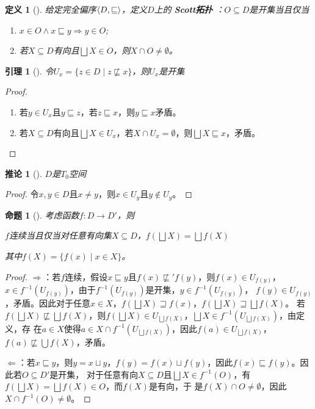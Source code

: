\documentclass[11pt]{article}
\newtheorem{corollary}[theorem]{推论}
\newtheorem{proposition}[theorem]{命题}
\newtheorem{lemma}[theorem]{引理}
\newtheorem{definition}[theorem]{定义}
\begin{document}
\begin{definition}[]
给定完全偏序\(\langle D,\sqsubseteq\rangle\)，定义\(D\)上的 \textbf{Scott拓扑} ：\(O\subseteq D\)是开集当且仅当
\begin{enumerate}
\item \(x\in O\wedge x\sqsubseteq y\Rightarrow y\in O\);
\item 若\(X\subseteq D\)有向且\(\bigsqcup X\in O\)，则\(X\cap O\neq\emptyset\)。
\end{enumerate}
\end{definition}

\begin{lemma}[]
令\(U_x=\{z\in D\mid z\not\sqsubseteq x\}\)，则\(U_x\)是开集
\end{lemma}

\begin{proof}
\begin{enumerate}
\item 若\(y\in U_x\)且\(y\sqsubseteq z\)，若\(z\sqsubseteq x\)，则\(y\sqsubseteq x\)矛盾。
\item 若\(X\subseteq D\)有向且\(\bigsqcup X\in U_x\)，若\(X\cap U_x=\emptyset\)，则\(\bigsqcup X\sqsubseteq x\)，矛盾。
\end{enumerate}
\end{proof}

\begin{corollary}[]
\(D\)是\(T_0\)空间
\end{corollary}

\begin{proof}
令\(x,y\in D\)且\(x\neq y\)，则\(x\in U_y\)且\(y\notin U_y\)。
\end{proof}

\begin{proposition}[]
考虑函数\(f:D\to D'\)，则
\begin{center}
\(f\)连续当且仅当对任意有向集\(X\subseteq D\)，\(f(\bigsqcup X)=\bigsqcup f(X)\)
\end{center}
其中\(f(X)=\{f(x)\mid x\in X\}\)。
\end{proposition}

\begin{proof}
\(\Rightarrow\)：若\(f\)连续，假设\(x\sqsubseteq y\)且\(f(x)\not\sqsubseteq' f(y)\)，则\(f(x)\in U_{f(y)}\)，
\(x\in f^{-1}(U_{f(y)})\)，由于\(f^{-1}(U_{f(y)})\)是开集，\(y\in f^{-1}(U_{f(y)})\)，
\(f(y)\in U_{f(y)}\)，矛盾。因此对于任意\(x\in X\)，\(f(\bigsqcup X)\sqsupseteq f(x)\)，\(f(\bigsqcup X)\sqsupseteq\bigsqcup f(X)\)。
若\(f(\bigsqcup X)\not\sqsubseteq\bigsqcup f(X)\)，则\(f(\bigsqcup X)\in U_{\bigsqcup f(X)}\)，\(\bigsqcup X\in f^{-1}(U_{\bigsqcup f(X)})\)，由定义，存
在\(a\in X\)使得\(a\in X\cap f^{-1}(U_{\bigsqcup f(X)})\)，因此\(f(a)\in U_{\bigsqcup f(X)}\)，\(f(a)\not\sqsubseteq\bigcup f(X)\)，矛盾。

\(\Leftarrow\)：若\(x\sqsubseteq y\)，则\(y=x\sqcup y\)，\(f(y)=f(x)\sqcup f(y)\)，因此\(f(x)\sqsubseteq f(y)\)。因此若\(O\subseteq D'\)是开集，
对于任意有向\(X\subseteq D\)且\(\bigsqcup X\in f^{-1}(O)\)，有\(f(\bigsqcup X)=\bigsqcup f(X)\in O\)，而\(f(X)\)是有向，于
是\(f(X)\cap O\neq\emptyset\)，因此\(X\cap f^{-1}(O)\neq\emptyset\)。
\end{proof}
\end{document}
